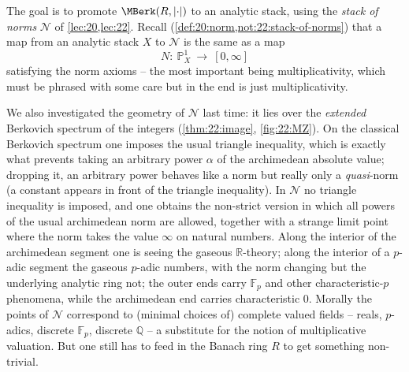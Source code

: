 The goal is to promote $\MBerk(R,\lvert\cdot\rvert)$ to an analytic stack, using
the \emph{stack of norms} $\mathcal N$ of \cref{lec:20,lec:22}. Recall
(\cref{def:20:norm,not:22:stack-of-norms}) that a map from an analytic stack
$X$ to $\mathcal N$ is the same as a map
\begin{equation*}
N\colon\ \mathbb P^1_X\ \longrightarrow\ [0,\infty]
\end{equation*}
satisfying the norm axioms -- the most important being multiplicativity, which
must be phrased with some care but in the end is just multiplicativity.

We also investigated the geometry of $\mathcal N$ last time: it lies over the
\emph{extended} Berkovich spectrum of the integers (\cref{thm:22:image},
\cref{fig:22:MZ}). On the classical Berkovich spectrum one imposes the usual
triangle inequality, which is exactly what prevents taking an arbitrary power
$\alpha$ of the archimedean absolute value; dropping it, an arbitrary power
behaves like a norm but really only a \emph{quasi}-norm (a constant appears in
front of the triangle inequality). In $\mathcal N$ no triangle inequality is
imposed, and one obtains the non-strict version in which all powers of the usual
archimedean norm are allowed, together with a strange limit point where the norm
takes the value $\infty$ on natural numbers. Along the interior of the
archimedean segment one is seeing the gaseous $\mathbb R$-theory; along the
interior of a $p$-adic segment the gaseous $p$-adic numbers, with the norm
changing but the underlying analytic ring not; the outer ends carry
$\mathbb F_p$ and other characteristic-$p$ phenomena, while the archimedean end
carries characteristic $0$. Morally the points of $\mathcal N$ correspond to
(minimal choices of) complete valued fields -- reals, $p$-adics, discrete
$\mathbb F_p$, discrete $\mathbb Q$ -- a substitute for the notion of
multiplicative valuation. But one still has to feed in the Banach ring $R$ to
get something non-trivial.

